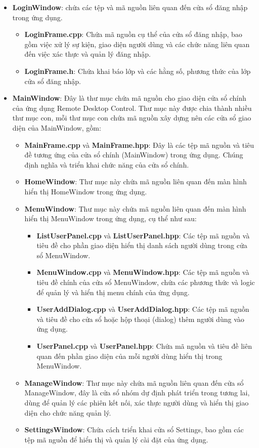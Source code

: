 \begin{itemize}
\begin{itemize}
	\end{itemize}
	\item \textbf{LoginWindow}: chứa các tệp và mã nguồn liên quan đến cửa sổ đăng nhập trong ứng dụng.
	\begin{itemize}
		\item \textbf{LoginFrame.cpp}: Chứa mã nguồn cụ thể của cửa sổ đăng nhập, bao gồm việc xử lý sự kiện, giao diện người dùng và các chức năng liên quan đến việc xác thực và quản lý đăng nhập.
		\item \textbf{LoginFrame.h}: Chứa khai báo lớp và các hằng số, phương thức của lớp cửa sổ đăng nhập.
	\end{itemize} 
	\item \textbf{MainWindow}: Đây là thư mục chứa mã nguồn cho giao diện cửa sổ chính của ứng dụng Remote Desktop Control. Thư mục này được chia thành nhiều thư mục con, mỗi thư mục con chứa mã nguồn xây dựng nên các cửa sổ giao diện của MainWindow, gồm:
	\begin{itemize}
		\item \textbf{MainFrame.cpp} và \textbf{MainFrame.hpp}: Đây là các tệp mã nguồn và tiêu đề tương ứng của cửa sổ chính (MainWindow) trong ứng dụng. Chúng định nghĩa và triển khai chức năng của cửa sổ chính.
		\item \textbf{HomeWindow}: Thư mục này chứa mã nguồn liên quan đến màn hình hiển thị HomeWindow trong ứng dụng.
		\item \textbf{MenuWindow}: Thư mục này chứa mã nguồn liên quan đến màn hình hiển thị MenuWindow trong ứng dụng, cụ thể như sau:
		\begin{itemize}
			\item \textbf{ListUserPanel.cpp} và \textbf{ListUserPanel.hpp}: Các tệp mã nguồn và tiêu đề cho phần giao diện hiển thị danh sách người dùng trong cửa sổ MenuWindow.
			\item \textbf{MenuWindow.cpp} và \textbf{MenuWindow.hpp}: Các tệp mã nguồn và tiêu đề chính của cửa sổ MenuWindow, chứa các phương thức và logic để quản lý và hiển thị menu chính của ứng dụng.
			\item \textbf{UserAddDialog.cpp} và \textbf{UserAddDialog.hpp}: Các tệp mã nguồn và tiêu đề cho cửa sổ hoặc hộp thoại (dialog) thêm người dùng vào ứng dụng.
			\item \textbf{UserPanel.cpp} và \textbf{UserPanel.hpp}: Chứa mã nguồn và tiêu đề liên quan đến phần giao diện của mỗi người dùng hiển thị trong MenuWindow.
		\end{itemize}
		\item \textbf{ManageWindow}: Thư mục này chứa mã nguồn liên quan đến cửa sổ ManageWindow, đây là cửa sổ nhóm dự định phát triển trong tương lai, dùng để quản lý các phiên kết nối, xác thực người dùng và hiển thị giao diện cho chức năng quản lý.	
		\item \textbf{SettingsWindow}: Chứa cách triển khai cửa sổ Settings, bao gồm các tệp mã nguồn để hiển thị và quản lý cài đặt của ứng dụng.
	\end{itemize}
\end{itemize}	